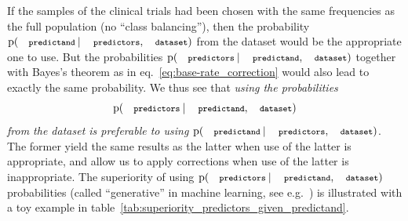 \documentclass[utf8]{FrontiersinHarvard} %
\newcommand*{\sect}{\S}%
\newcommand*{\eqn}{eq.}%
\newcommand*{\eg}{{e.g.}}
\newcommand*{\p}{\mathrm{p}}%
\renewcommand*{\|}[1][]{\nonscript\:#1\vert\nonscript\:\mathopen{}}
\newcommand*{\predictors}{\texttt{\footnotesize predictors}}
\newcommand*{\predictand}{\texttt{\footnotesize predictand}}
\newcommand*{\dataset}{\texttt{\footnotesize dataset}}
\begin{document}
If the samples of the clinical trials had been chosen with the same frequencies as the full population (no \enquote{class balancing}), then the probability $\p(\predictand \| \predictors, \dataset)$ from the dataset would be the appropriate one to use. But the probabilities $\p(\predictors \| \predictand, \dataset)$ together with Bayes's theorem as in \eqn~\eqref{eq:base-rate_correction} would also lead to exactly the same probability. We thus see that \emph{using the probabilities}
\[\p(\predictors \| \predictand, \dataset)\]
\emph{from the dataset is preferable to using} $\p(\predictand \| \predictors, \dataset)$. The former yield the same results as the latter when use of the latter is appropriate, and allow us to apply corrections when use of the latter is inappropriate. The superiority of using $\p(\predictors \| \predictand, \dataset)$ probabilities (called \enquote{generative} in machine learning, see \eg\ \citealp[\sect~8.6]{murphy2012}) is illustrated with a toy example in table~\ref{tab:superiority_predictors_given_predictand}.
\end{document}

